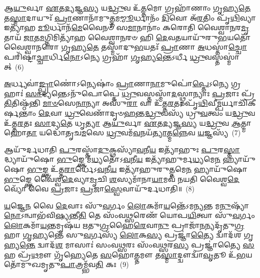 {\anuvakamend[{𑌇𑌤𑍀॑\-\ul{𑌨𑍍𑌦𑍍𑌰𑌿}\-𑌯\-\ul{𑌮𑍇}\-𑌵 𑌪𑍁𑌨𑌃᳴𑌪𑍁𑌨𑌰𑍍𑌨\-\ul{𑌯𑍇}\-𑌤𑍍𑌤𑍍𑌰𑌯᳴𑌸𑍍𑌤𑍍𑌰𑌿𑍞𑌶𑌚𑍍𑌚}]}%

𑌆\-\ul{𑌯𑍁}\-𑌰𑍍𑌵𑌾 \ul{𑌏}\-𑌤\-\ul{𑌦𑍍𑌯}\-𑌜𑍍𑌞\-\ul{𑌸𑍍𑌯} 𑌯\-\ul{𑌦𑍍𑌧𑍍𑌰𑍁}\-𑌵 𑌉᳴\-\ul{𑌤𑍍𑌤}\-𑌮𑍋 𑌗𑍍𑌰𑌹𑌾᳴𑌣𑌾𑌂 𑌗𑍃𑌹𑍍𑌯\-\ul{𑌤𑍇} 𑌤\-\ul{𑌸𑍍𑌮𑌾}\-𑌦𑌾𑌯𑍁𑌃᳴ \ul{𑌪𑍍𑌰𑌾}\-𑌣𑌾𑌨𑌾᳴𑌮𑍁\-\ul{𑌤𑍍𑌤}\-𑌮\-\ul{𑌮𑍍𑌮𑍂}\-𑌰𑍍𑌧𑌾𑌨𑌂᳴ \ul{𑌦𑌿}\-𑌵𑍋 𑌅᳴\-\ul{𑌰}\-𑌤𑌿𑌂 𑌪𑍃᳴\-\ul{𑌥𑌿}\-𑌵𑍍𑌯𑌾 𑌇𑌤𑍍𑌯𑌾᳴𑌹 \ul{𑌮𑍂}\-𑌰𑍍𑌧𑌾𑌨᳴\-\ul{𑌮𑍇}\-𑌵𑍈𑌨𑍞᳴ 𑌸\-\ul{𑌮𑌾}\-𑌨𑌾𑌨𑌾𑌂॑ 𑌕𑌰𑍋𑌤𑌿 𑌵𑍈𑌶𑍍𑌵𑌾\-\ul{𑌨}\-𑌰\-\ul{𑌮𑍃}\-𑌤𑌾𑌯᳴ \ul{𑌜𑌾}\-𑌤\-\ul{𑌮}\-𑌗𑍍𑌨𑌿𑌮𑌿𑌤𑍍𑌯𑌾᳴𑌹 𑌵𑍈𑌶𑍍𑌵𑌾\-\ul{𑌨}\-𑌰𑍞 𑌹𑌿 \ul{𑌦𑍇}\-𑌵\-\ul{𑌤}\-𑌯𑌾𑌯𑍁᳴𑌰𑍁\-\ul{𑌭}\-𑌯𑌤𑍋᳴𑌵𑍈𑌶𑍍𑌵𑌾𑌨𑌰𑍋 𑌗𑍃𑌹𑍍𑌯\-\ul{𑌤𑍇} 𑌤𑌸𑍍𑌮𑌾᳴𑌦𑍁\-\ul{𑌭}\-𑌯𑌤𑌃᳴ \ul{𑌪𑍍𑌰𑌾}\-𑌣𑌾 \ul{𑌅}\-𑌧𑌸𑍍𑌤𑌾॑\-\ul{𑌚𑍍𑌚𑍋}\-𑌪𑌰𑌿᳴𑌷𑍍𑌟𑌾\-\ul{𑌚𑍍𑌚𑌾}\-𑌰𑍍𑌧𑌿\-\ul{𑌨𑍋}\-\-𑌽𑌨𑍍𑌯𑍇 𑌗𑍍𑌰𑌹𑌾᳴ \ul{𑌗𑍃}\-𑌹𑍍𑌯\-\ul{𑌨𑍍𑌤𑍇}\-\-𑌽𑌰𑍍𑌧𑍀 \ul{𑌧𑍍𑌰𑍁}\-𑌵𑌸𑍍𑌤𑌸𑍍𑌮𑌾॑𑌤𑍍~(6)

\-\ul{𑌅}\-𑌰𑍍𑌧𑍍𑌯𑌵𑌾॑\-\ul{𑌙𑍍𑌪𑍍𑌰𑌾}\-𑌣𑍋॑\-𑌽𑌨𑍍𑌯𑍇𑌷𑌾𑌂॑ \ul{𑌪𑍍𑌰𑌾}\-𑌣𑌾\-\ul{𑌨𑌾}\-𑌮𑍁𑌪𑍋॑\-\ul{𑌪𑍍𑌤𑍇}\-\-𑌽𑌨𑍍𑌯𑍇 𑌗𑍍𑌰𑌹𑌾𑌃॑ \ul{𑌸𑌾}\-𑌦𑍍𑌯𑌨𑍍𑌤𑍇\-𑌽𑌨𑍁᳴𑌪𑍋𑌪𑍍𑌤𑍇 \ul{𑌧𑍍𑌰𑍁}\-𑌵𑌸𑍍𑌤𑌸𑍍𑌮𑌾᳴\-\ul{𑌦}\-𑌸𑍍𑌥𑍍𑌨𑌾𑌨𑍍𑌯𑌾𑌃 \ul{𑌪𑍍𑌰}\-𑌜𑌾𑌃 𑌪𑍍𑌰᳴\-\ul{𑌤𑌿}\-𑌤𑌿𑌷𑍍𑌠᳴𑌨𑍍𑌤𑌿 \ul{𑌮𑌾}\-\-\ul{𑍞}\-𑌸𑍇\-\ul{𑌨𑌾}\-𑌨𑍍𑌯𑌾 𑌅𑌸𑍁᳴\-\ul{𑌰𑌾} 𑌵𑌾 𑌉᳴𑌤𑍍𑌤\-\ul{𑌰}\-𑌤𑌃 𑌪𑍃᳴\-\ul{𑌥𑌿}\-𑌵𑍀\-\ul{𑌮𑍍𑌪}\-𑌰𑍍𑌯𑌾𑌚𑌿᳴𑌕𑍀𑌰𑍍\mbox{}\-\ul{𑌷}\-𑌨𑍍𑌤𑌾𑌂 \ul{𑌦𑍇}\-𑌵𑌾 \ul{𑌧𑍍𑌰𑍁}\-𑌵𑍇𑌣𑌾᳴𑌦𑍃𑍞\-\ul{𑌹}\-𑌨𑍍𑌤\-\ul{𑌦𑍍𑌧𑍍𑌰𑍁}\-𑌵𑌸𑍍𑌯᳴ 𑌧𑍍𑌰𑍁\-\ul{𑌵}\-𑌤𑍍𑌵𑌂 𑌯\-\ul{𑌦𑍍𑌧𑍍𑌰𑍁}\-𑌵 𑌉᳴𑌤𑍍𑌤\-\ul{𑌰}\-𑌤𑌃 \ul{𑌸𑌾}\-𑌦𑍍𑌯\-\ul{𑌤𑍇} 𑌧𑍃\-\ul{𑌤𑍍𑌯𑌾} 𑌆\-\ul{𑌯𑍁}\-𑌰𑍍𑌵𑌾 \ul{𑌏}\-𑌤\-\ul{𑌦𑍍𑌯}\-𑌜𑍍𑌞\-\ul{𑌸𑍍𑌯} 𑌯\-\ul{𑌦𑍍𑌧𑍍𑌰𑍁}\-𑌵 \ul{𑌆}\-𑌤𑍍𑌮𑌾 𑌹𑍋\-\ul{𑌤𑌾} 𑌯𑌦𑍍𑌧𑍋᳴𑌤𑍃𑌚\-\ul{𑌮}\-𑌸𑍇 \ul{𑌧𑍍𑌰𑍁}\-𑌵𑌮᳴\-\ul{𑌵}\-𑌨𑌯᳴\-\ul{𑌤𑍍𑌯𑌾}\-𑌤𑍍𑌮\-\ul{𑌨𑍍𑌨𑍇}\-𑌵 \ul{𑌯}\-𑌜𑍍𑌞𑌸𑍍𑌯᳴~(7)

𑌆𑌯𑍁᳴𑌰𑍍𑌦𑌧𑌾𑌤𑌿 \ul{𑌪𑍁}\-𑌰𑌸𑍍𑌤𑌾᳴\-\ul{𑌦𑍁}\-𑌕𑍍𑌥𑌸𑍍𑌯𑌾᳴\-\ul{𑌵}\-𑌨𑍀\-\ul{𑌯} 𑌇𑌤𑍍𑌯𑌾᳴𑌹𑍁𑌃 \ul{𑌪𑍁}\-𑌰\-\ul{𑌸𑍍𑌤𑌾}\-𑌦𑍍𑌧𑍍𑌯𑌾𑌯𑍁᳴𑌷𑍋 \ul{𑌭𑍁}\-𑌙𑍍𑌕𑍍𑌤𑍇 𑌮᳴\-\ul{𑌧𑍍𑌯}\-𑌤𑍋᳴\-𑌽\-\ul{𑌵}\-𑌨𑍀\-\ul{𑌯} 𑌇𑌤𑍍𑌯𑌾᳴𑌹𑍁𑌰𑍍𑌮\-\ul{𑌧𑍍𑌯}\-𑌮𑍇\-\ul{𑌨} 𑌹𑍍𑌯𑌾𑌯𑍁᳴𑌷𑍋 \ul{𑌭𑍁}\-𑌙𑍍𑌕𑍍𑌤 𑌉᳴𑌤𑍍𑌤\-\ul{𑌰𑌾}\-𑌰𑍍𑌧𑍇᳴\-𑌽\-\ul{𑌵}\-𑌨𑍀\-\ul{𑌯} 𑌇𑌤𑍍𑌯𑌾᳴𑌹𑍁𑌰𑍁\-\ul{𑌤𑍍𑌤}\-𑌮𑍇\-\ul{𑌨} 𑌹𑍍𑌯𑌾𑌯𑍁᳴𑌷𑍋 \ul{𑌭𑍁}\-𑌙𑍍𑌕𑍍𑌤𑍇 𑌵𑍈॑𑌶𑍍𑌵\-\ul{𑌦𑍇}\-𑌵𑍍𑌯𑌾\-\ul{𑌮𑍃}\-𑌚𑌿 \ul{𑌶}\-𑌸𑍍𑌯𑌮𑌾᳴𑌨𑌾\-\ul{𑌯𑌾}\-𑌮𑌵᳴ 𑌨𑌯𑌤𑌿 𑌵𑍈𑌶𑍍𑌵\-\ul{𑌦𑍇}\-𑌵𑍍𑌯𑍋᳴ 𑌵𑍈 \ul{𑌪𑍍𑌰}\-𑌜𑌾𑌃 \ul{𑌪𑍍𑌰}\-𑌜𑌾\-\ul{𑌸𑍍𑌵𑍇}\-𑌵𑌾𑌯𑍁᳴𑌰𑍍𑌦𑌧𑌾𑌤𑌿॥~(8)

{\anuvakamend[{\-\ul{𑌧𑍍𑌰𑍁}\-𑌵𑌸𑍍𑌤𑌸𑍍𑌮𑌾᳴\-\ul{𑌦𑍇}\-𑌵 \ul{𑌯}\-𑌜𑍍𑌞𑌸𑍍𑌯𑍈\-\ul{𑌕𑌾}\-𑌨𑍍𑌨𑌚᳴𑌤𑍍𑌵𑌾\-\ul{𑌰𑌿}\-\-\ul{𑍞}\-𑌶𑌚𑍍𑌚᳴}]}%

\-\ul{𑌯}\-𑌜𑍍𑌞𑍇\-\ul{𑌨} 𑌵𑍈 \ul{𑌦𑍇}\-𑌵𑌾𑌃 𑌸𑍁᳴\-\ul{𑌵}\-𑌰𑍍𑌗𑌂 \ul{𑌲𑍋}\-𑌕𑌮𑌾᳴\-\ul{𑌯}\-𑌨𑍍𑌤𑍇᳴\-𑌽𑌮𑌨𑍍𑌯𑌨𑍍𑌤 𑌮\-\ul{𑌨𑍁}\-𑌷𑍍𑌯𑌾᳴ \ul{𑌨𑍋}\-\-𑌽𑌨𑍍𑌵𑌾𑌭᳴𑌵𑌿\-\ul{𑌷𑍍𑌯}\-𑌨𑍍𑌤𑍀\-\ul{𑌤𑌿} 𑌤𑍇 𑌸𑌂᳴𑌵\-\ul{𑌥𑍍𑌸}\-𑌰𑍇𑌣᳴ 𑌯𑍋𑌪\-\ul{𑌯𑌿}\-𑌤𑍍𑌵𑌾 𑌸𑍁᳴\-\ul{𑌵}\-𑌰𑍍𑌗𑌂 \ul{𑌲𑍋}\-𑌕𑌮𑌾᳴\-\ul{𑌯}\-𑌨𑍍𑌤𑌮𑍃𑌷᳴𑌯 𑌋𑌤𑍁\-\ul{𑌗𑍍𑌰}\-𑌹𑍈\-\ul{𑌰𑍇}\-𑌵𑌾\-\ul{𑌨𑍁} 𑌪𑍍𑌰𑌾𑌜𑌾᳴\-\ul{𑌨}\-\-\ul{𑌨𑍍}\-𑌯𑌦𑍃᳴𑌤𑍁\-\ul{𑌗𑍍𑌰}\-𑌹𑌾 \ul{𑌗𑍃}\-𑌹𑍍𑌯𑌨𑍍𑌤𑍇᳴ 𑌸𑍁\-\ul{𑌵}\-𑌰𑍍𑌗𑌸𑍍𑌯᳴ \ul{𑌲𑍋}\-𑌕\-\ul{𑌸𑍍𑌯} 𑌪𑍍𑌰𑌜𑍍𑌞𑌾॑\-\ul{𑌤𑍍𑌯𑍈} 𑌦𑍍𑌵𑌾𑌦᳴𑌶 𑌗𑍃𑌹𑍍𑌯\-\ul{𑌨𑍍𑌤𑍇} 𑌦𑍍𑌵𑌾𑌦᳴\-\ul{𑌶} 𑌮𑌾𑌸𑌾𑌃॑ 𑌸𑌂𑌵\-\ul{𑌥𑍍𑌸}\-𑌰𑌃 𑌸𑌂᳴𑌵\-\ul{𑌥𑍍𑌸}\-𑌰\-\ul{𑌸𑍍𑌯} 𑌪𑍍𑌰𑌜𑍍𑌞𑌾॑𑌤𑍍𑌯𑍈 \ul{𑌸}\-𑌹 𑌪𑍍𑌰᳴\-\ul{𑌥}\-𑌮𑍗 𑌗𑍃᳴𑌹𑍍𑌯𑍇𑌤𑍇 \ul{𑌸}\-𑌹𑍋\-\ul{𑌤𑍍𑌤}\-𑌮𑍗 𑌤\-\ul{𑌸𑍍𑌮𑌾}\-𑌦𑍍𑌦𑍍𑌵𑍗𑌦𑍍𑌵𑌾᳴\-\ul{𑌵𑍃}\-𑌤𑍂 𑌉᳴\-\ul{𑌭}\-𑌯𑌤𑍋᳴𑌮𑍁𑌖𑌮𑍃𑌤𑍁\-\ul{𑌪𑌾}\-𑌤𑍍𑌰𑌮𑍍𑌭᳴𑌵\-\ul{𑌤𑌿} 𑌕𑌃~(9)

